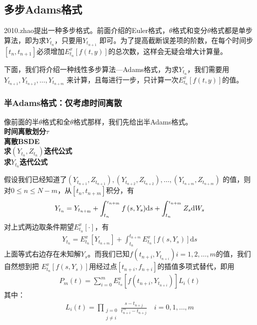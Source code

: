 	\subsection{多步Adams格式}

		2010.zhao\cite{2010.zhao}提出一种多步格式。前面介绍的Euler格式，$\theta$格式和变分$\theta$格式都是单步算法，即为求$Y_{t_n}$，只要用$Y_{t_{n+1}}$ 即可。为了提高截断误差项的阶数，在每个时间步$[t_n,t_{n+1}]$必须增加$E_{t_n}^x[f(t,y)]$的总次数，这样会无疑会增大计算量。
		\par
		下面，我们将介绍一种线性多步算法—Adams格式，为求$Y_{t_n}$，我们需要用$Y_{t_{n+1}},Y_{t_{n+2}},\ldots,Y_{t_{n+m}}$ 来计算，且每进行一步，只计算一次$E_{t_n}^x[f(t,y)]$的值。
		\subsubsection{半Adams格式：仅考虑时间离散}
		像前面的半$\theta$格式和全$\theta $格式那样，我们先给出半Adams格式。\\
			\textbf{时间离散划分$\tau$}\\
			\textbf{离散BSDE}\\
			\textbf{求$(Y_{t_n},Z_{t_n})$迭代公式}\\
			\checkmark \textbf{求$Y_{t_n}$迭代公式}
			\par
			假设我们已经知道了$(Y_{t_{n+1}},Z_{t_{n+1}}),(Y_{t_{n+2}},Z_{t_{n+2}}),\ldots,(Y_{t_{n+m}},Z_{t_{n+m}})$ 的值，则对$0 \leqslant n \leqslant N-m$，从$[t_n,t_{n+m}]$积分，有
						\begin{align}\label{eq:Adams原式}
						{Y_{{t_n}}} = {Y_{{t_{n{\rm{ + m}}}}}} + \int_{{t_n}}^{_{{t_{n{\rm{ + m}}}}}} {f\left( {s,{Y_s}} \right)} \mathrm{d}s + \int_{{t_n}}^{_{{t_{n{\rm{ + m}}}}}} {{Z_s}\mathrm{d}{W_s}}
						\end{align}
			对上式两边取条件期望$E_{{t_n}}^x[\cdot]$，有
			\begin{align*}
			Y_{t_n} = E_{{t_n}}^x\left[ Y_{{t_{n + m}}} \right] + \int_{{t_n}}^{{t_{n + m}}} {E_{{t_n}}^x\left[ {f\left( s,{Y_s} \right)} \right]\mathrm{d}s}
			\end{align*}
			上面等式右边存在未知解$Y_s$。而我们已知$f(t_{n+i},Y_{t_{n+i}})i=1,2,\ldots,m$的值，我们自然想到把
			$E_{t_n}^x[f(s,Y_s)]$用经过点$[t_{n+i},f_{n+i}]$的插值多项式替代，即用
			\begin{align*}
			P_m(t) = \sum\limits_{i = 0}^m E_{t_n}^x\left[f\left(t_{n + i},Y_{t_{n + i}}\right)\right]L_i(t)
			\end{align*}
			其中：
			\begin{align*}
			L_i(t) = \prod _{\substack{j=0\\j \neq i}} \frac{s - t_{n+j}}{t_{n+i}^m - t_{n+j}} \quad i= 0,1,\dots,m
			\end{align*}
